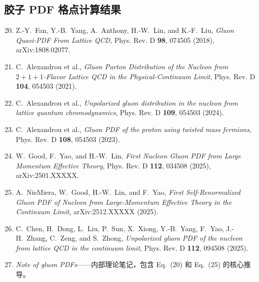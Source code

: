 \documentclass[11pt,a4paper]{ctexart}
\begin{document}
\subsection*{胶子 PDF 格点计算结果}
\begin{enumerate}\setcounter{enumi}{19}
  \item Z.-Y.~Fan, Y.-B.~Yang, A.~Anthony, H.-W.~Lin, and K.-F.~Liu, \textit{Gluon Quasi-PDF From Lattice QCD}, Phys. Rev. D \textbf{98}, 074505 (2018), arXiv:1808.02077.
  \item C.~Alexandrou et al., \textit{Gluon Parton Distribution of the Nucleon from $2+1+1$-Flavor Lattice QCD in the Physical-Continuum Limit}, Phys. Rev. D \textbf{104}, 054503 (2021).
  \item C.~Alexandrou et al., \textit{Unpolarized gluon distribution in the nucleon from lattice quantum chromodynamics}, Phys. Rev. D \textbf{109}, 054503 (2024).
  \item C.~Alexandrou et al., \textit{Gluon PDF of the proton using twisted mass fermions}, Phys. Rev. D \textbf{108}, 054503 (2023).
  \item W.~Good, F.~Yao, and H.-W.~Lin, \textit{First Nucleon Gluon PDF from Large Momentum Effective Theory}, Phys. Rev. D \textbf{112}, 034508 (2025), arXiv:2501.XXXXX.
  \item A.~NieMiera, W.~Good, H.-W.~Lin, and F.~Yao, \textit{First Self-Renormalized Gluon PDF of Nucleon from Large-Momentum Effective Theory in the Continuum Limit}, arXiv:2512.XXXXX (2025).
  \item C.~Chen, H.~Dong, L.~Liu, P.~Sun, X.~Xiong, Y.-B.~Yang, F.~Yao, J.-H.~Zhang, C.~Zeng, and S.~Zhong, \textit{Unpolarized gluon PDF of the nucleon from lattice QCD in the continuum limit}, Phys. Rev. D \textbf{112}, 094508 (2025).
  \item \textit{Note of gluon PDFs}——内部理论笔记，包含 Eq.~(20) 和 Eq.~(25) 的核心推导。
\end{enumerate}
\end{document}
